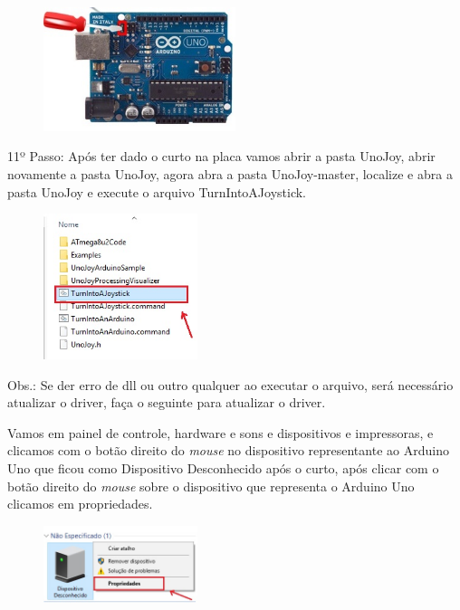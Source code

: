 \documentclass[
	12pt,			%
	openright,		%
	oneside,			%
	a4paper,			%
	chapter=TITLE,		%
	english,			%
	brazil,			%
	]{abntex2}
\begin{document}
\begin{anexosenv}
\begin{figure}[H]
	\centering
		\includegraphics[width=0.5\textwidth]{./img/anex-img-10.jpg}
\end{figure}

11º Passo: Após ter dado o curto na placa  vamos abrir a pasta UnoJoy, abrir novamente a pasta UnoJoy,  agora abra a pasta UnoJoy-master, localize e abra a pasta UnoJoy e execute o arquivo TurnIntoAJoystick.

\begin{figure}[H]
	\centering
		\includegraphics[width=0.4\textwidth]{./img/anex-img-11.jpg}
\end{figure}

Obs.: Se der erro de dll ou outro qualquer ao executar o arquivo, será necessário atualizar o driver, faça o seguinte para atualizar o driver. 

Vamos em painel de controle, hardware e sons e dispositivos e impressoras, e clicamos com o botão direito do \emph{mouse} no dispositivo representante ao Arduino Uno que ficou como Dispositivo Desconhecido após o curto, após clicar com o botão direito do \emph{mouse} sobre o dispositivo que representa o Arduino Uno clicamos  em propriedades.

\begin{figure}[H]
	\centering
		\includegraphics[width=0.4\textwidth]{./img/anex-img-12.jpg}
\end{figure}


\end{anexosenv}
\end{document}
